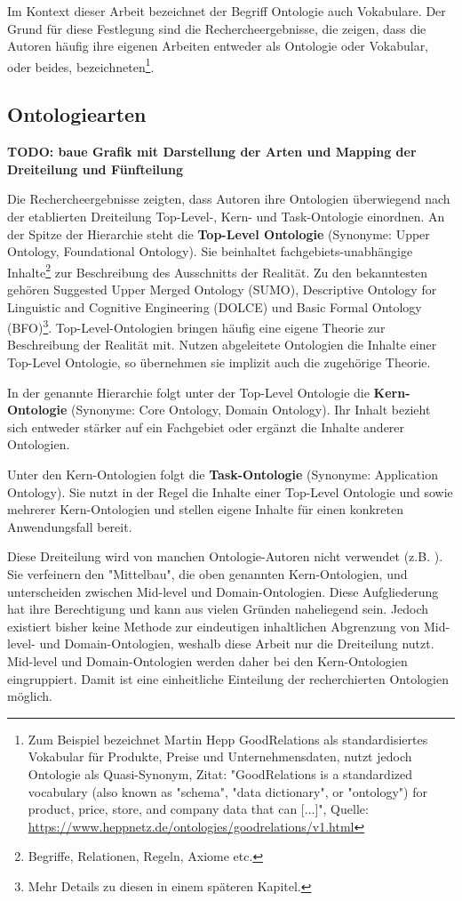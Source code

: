 \documentclass{article}
\begin{document}
Im Kontext dieser Arbeit bezeichnet der Begriff Ontologie auch Vokabulare.
Der Grund für diese Festlegung sind die Rechercheergebnisse, die zeigen, dass die Autoren häufig ihre eigenen Arbeiten entweder als Ontologie oder Vokabular, oder beides, bezeichneten\footnote{Zum Beispiel bezeichnet Martin Hepp GoodRelations als standardisiertes Vokabular für Produkte, Preise und Unternehmensdaten, nutzt jedoch Ontologie als Quasi-Synonym, Zitat: "GoodRelations is a standardized vocabulary (also known as "schema", "data dictionary", or "ontology") for product, price, store, and company data that can [...]", Quelle: \url{https://www.heppnetz.de/ontologies/goodrelations/v1.html}}.

\subsection{Ontologiearten}

\textbf{TODO: baue Grafik mit Darstellung der Arten und Mapping der Dreiteilung und Fünfteilung}

Die Rechercheergebnisse zeigten, dass Autoren ihre Ontologien überwiegend nach der etablierten Dreiteilung Top-Level-, Kern- und Task-Ontologie einordnen.
An der Spitze der Hierarchie steht die \textbf{Top-Level Ontologie} (Synonyme: Upper Ontology, Foundational Ontology).
Sie beinhaltet fachgebiets-unabhängige Inhalte\footnote{Begriffe, Relationen, Regeln, Axiome etc.} zur Beschreibung des Ausschnitts der Realität.
Zu den bekanntesten gehören Suggested Upper Merged Ontology (SUMO), Descriptive Ontology for Linguistic and Cognitive Engineering (DOLCE) und Basic Formal Ontology (BFO)\footnote{Mehr Details zu diesen in einem späteren Kapitel.}.
Top-Level-Ontologien bringen häufig eine eigene Theorie zur Beschreibung der Realität mit.
Nutzen abgeleitete Ontologien die Inhalte einer Top-Level Ontologie, so übernehmen sie implizit auch die zugehörige Theorie.

In der genannte Hierarchie folgt unter der Top-Level Ontologie die \textbf{Kern-Ontologie} (Synonyme: Core Ontology, Domain Ontology).
Ihr Inhalt bezieht sich entweder stärker auf ein Fachgebiet oder ergänzt die Inhalte anderer Ontologien.

Unter den Kern-Ontologien folgt die \textbf{Task-Ontologie} (Synonyme: Application Ontology).
Sie nutzt in der Regel die Inhalte einer Top-Level Ontologie und sowie mehrerer Kern-Ontologien und stellen eigene Inhalte für einen konkreten Anwendungsfall bereit.

Diese Dreiteilung wird von manchen Ontologie-Autoren nicht verwendet (z.B. \cite{kulvatunyou2022}).
Sie verfeinern den "Mittelbau", die oben genannten Kern-Ontologien, und unterscheiden zwischen Mid-level und Domain-Ontologien.
Diese Aufgliederung hat ihre Berechtigung und kann aus vielen Gründen naheliegend sein.
Jedoch existiert bisher keine Methode zur eindeutigen inhaltlichen Abgrenzung von Mid-level- und Domain-Ontologien, weshalb diese Arbeit nur die Dreiteilung nutzt.
Mid-level und Domain-Ontologien werden daher bei den Kern-Ontologien eingruppiert.
Damit ist eine einheitliche Einteilung der recherchierten Ontologien möglich.
\end{document}
